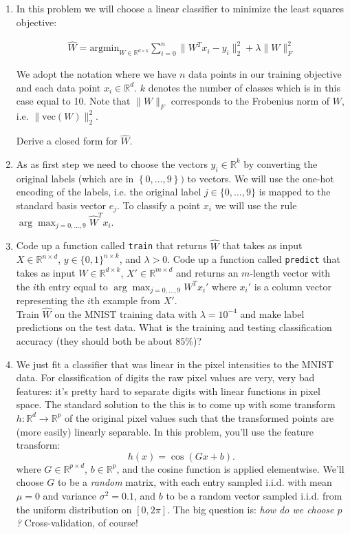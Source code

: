 \documentclass{article}
\newcommand{\1}{\mathbf{1}}
\def\R{\mathbb{R}}
\begin{document}
\begin{enumerate}
\item In this problem we will choose a linear classifier to minimize the least squares objective:

\begin{align*}\widehat{W} = \text{argmin}_{W \in \R^{d \times k}} \sum_{i=0}^{n} \| W^Tx_{i} - y_{i} \|^{2}_{2} + \lambda \|W\|_{F}^{2}
\end{align*}

We adopt the notation where we have $n$ data points in our training objective 
and each data point $x_i \in \R^d$. $k$ denotes
the number of classes which is in this case equal to 10. Note that $\|W\|_{F}$ corresponds to the Frobenius norm of $W$, i.e. $\|\text{vec}(W)\|_2^2$.

Derive a closed form for $\widehat{W}$.

\item
As as first step we need to choose the vectors $y_i \in \mathbb{R}^k$ by converting the original labels (which are in $\left\{0,\ldots,9\right\})$ to
vectors.
We will use the one-hot encoding of the labels, i.e. the original label $j \in \{0, \ldots, 9\}$ is mapped to the standard basis vector $e_j$.
To classify a point $x_i$ we will use the rule $\arg\max_{j=0,\dots,9} \widehat{W}^T x_i$.

\item
Code up a function called \verb|train| that returns $\widehat{W}$ that takes as input $X \in\R^{n \times d}$, $y \in \{0,1\}^{n \times k}$, and $\lambda > 0$.
Code up a function called \verb|predict| that takes as input $W \in \R^{d \times k}$, $X' \in\R^{m \times d}$ and returns an $m$-length vector with the $i$th entry equal to $\arg\max_{j=0,\dots,9} W^T x_i'$ where $x_i'$ is a column vector representing the $i$th example from $X'$.\\

Train $\widehat{W}$ on the MNIST training data with $\lambda = 10^{-4}$ and make label predictions on the test data. What is the training and testing classification accuracy (they should both be about $85\%$)? 

\item We just fit a classifier that was linear in the pixel intensities to the MNIST data.
For classification of digits the raw pixel values are very, very bad features: it's pretty hard to separate digits with linear functions in pixel space.
The standard solution to the this is to come up with some transform $h : \mathbb{R}^d \rightarrow \mathbb{R}^p$ of the original pixel values such that the transformed points are (more easily) linearly separable.
In this problem, you'll use the feature transform:
\[
 h(x) = \cos(G x + b).
\]
where $G \in \mathbb{R}^{p \times d}$, $b \in \mathbb{R}^p$, and the cosine function is applied elementwise. 
We'll choose $G$ to be a \emph{random} matrix, with each entry sampled i.i.d. with mean $\mu=0$ and variance $\sigma^2=0.1$, and $b$ to be a random vector sampled i.i.d. from the uniform distribution on $[0,2\pi].$
The big question is: \emph{how do we choose $p$?} Cross-validation, of course!\\


\end{enumerate}
\end{document}

